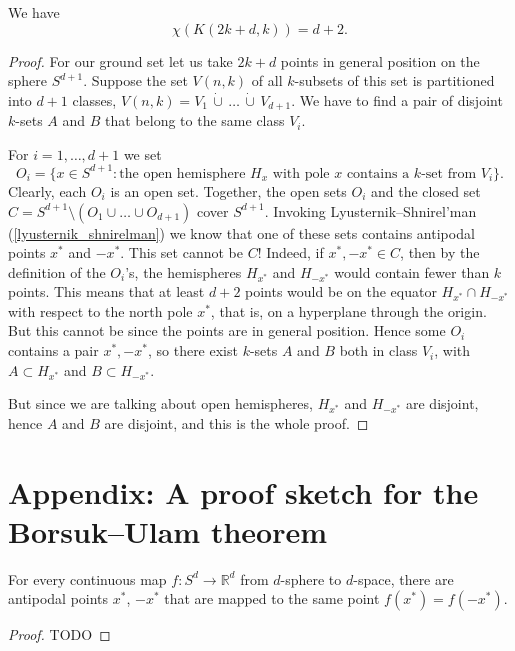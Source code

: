 \begin{theorem}
  \label{kneser_conjecture}
  We have
\[
\chi(K(2k + d, k)) = d + 2.
\]
\end{theorem}
\begin{proof}
For our ground set let us take $2k + d$ points in general position on the sphere $S^{d+1}$.
Suppose the set $V(n, k)$ of all $k$-subsets of this set is partitioned into $d + 1$ classes,
$V(n, k) = V_1 \,\dot{\cup} \, \dots \, \dot{\cup} \, V_{d+1}$. We have to find a pair of
disjoint $k$-sets $A$ and $B$ that belong to the same class $V_i$.

For $i = 1, \dots, d + 1$ we set
\[
O_i = \{x \in S^{d+1} : \text{the open hemisphere } H_x \text{ with pole } x \text{ contains a } k\text{-set from } V_i\}.
\]
Clearly, each $O_i$ is an open set. Together, the open sets $O_i$ and the
closed set $C = S^{d+1} \setminus (O_1 \cup \dots \cup O_{d+1})$ cover $S^{d+1}$.
Invoking Lyusternik–Shnirel'man (\ref{lyusternik_shnirelman}) we know that one of
these sets contains antipodal
 points $x^*$ and $-x^*$. This set cannot be $C$! Indeed, if $x^*, -x^* \in C$,
 then by the definition of the $O_i$'s, the hemispheres $H_{x^*}$ and $H_{-x^*}$
 would contain fewer than $k$ points. This means that at least $d + 2$ points would be
 on the equator $H_{x^*} \cap H_{-x^*}$ with respect to the north pole $x^*$, that is,
 on a hyperplane through the origin. But this cannot be since the points are in general
  position. Hence some $O_i$ contains a pair $x^*, -x^*$, so there exist $k$-sets $A$ and $B$
  both in class $V_i$, with $A \subset H_{x^*}$ and $B \subset H_{-x^*}$.

But since we are talking about open hemispheres, $H_{x^*}$ and $H_{-x^*}$ are disjoint,
hence $A$ and $B$ are disjoint, and this is the whole proof.
\end{proof}


\section{Appendix: A proof sketch for the Borsuk--Ulam theorem}
\begin{theorem}
  \label{borsuk_ulam}
  For every continuous map $f : S^d \to \mathbb{R}^d$ from $d$-sphere to $d$-space,
  there are antipodal points $x^*$, $-x^*$ that are mapped to the same point $f(x^*) = f(-x^*)$.
\end{theorem}
\begin{proof}
  TODO
\end{proof}

